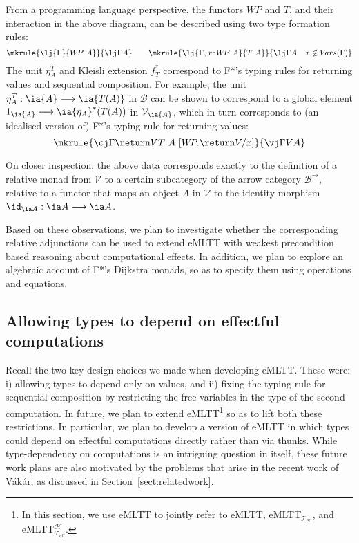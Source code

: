 From a programming language perspective, the functors $W\!P$ and $T$, and their interaction in the  above diagram, can be described using two type formation rules:
\vspace{0.15cm}
\[
\mkrule
{\lj {\Gamma} {W\!P~A}}
{\lj \Gamma A}
\qquad
\mkrule
{\lj {\Gamma, x \!:\! W\!P~A} {T~A}}
{\lj \Gamma A \quad x \not\in V\!ars(\Gamma)}
\]
The unit $\eta^T_A$ and Kleisli extension $f_T^\dagger$ correspond to F*'s typing rules for returning values and sequential composition. For example, the unit $\eta^T_A : \ia {A} \longrightarrow \ia {T(A)}$ in $\mathcal{B}$ can be shown to correspond to a global element $1_{\ia {A}} \longrightarrow \ia {\eta_A}^*(T(A))$ in $\mathcal{V}_{\ia {A}}$, which in turn corresponds to (an idealised version of) F*'s typing rule for returning values:
\vspace{0.15cm}
\[
\mkrule
{\cj \Gamma {\return V} {T~A~[W\!P.\return V/x]}}
{\vj \Gamma V A}
\]

On closer inspection, the above data corresponds exactly to the definition of a relative monad from $\mathcal{V}$ to a certain subcategory of the arrow category $\mathcal{B}^\to$, relative to a functor that maps an object $A$ in $\mathcal{V}$ to the identity morphism $\id_{\ia A} : \ia A \longrightarrow \ia A$.

Based on these observations, we plan to investigate whether the corresponding relative adjunctions can be used to extend eMLTT with weakest precondition based reasoning about computational effects. In addition, we plan to explore an algebraic account of F*'s Dijkstra monads, so as to specify them using operations and equations.




\subsection{Allowing types to depend on effectful computations}
\label{sect:typedependencyonfeffects}

Recall the two key design choices we made when developing eMLTT. These were: \linebreak i) allowing types to depend only on values, and ii) fixing the typing rule for sequential composition by restricting the free variables in the type of the second computation. In future, we plan to extend eMLTT\footnote{In this section, we use eMLTT to jointly refer to eMLTT, eMLTT$_{\mathcal{T}_{\text{eff}}}$, and eMLTT$_{\mathcal{T}_{\text{eff}}}^{\mathcal{H}}$.} so as to lift both these restrictions. In particular, we plan to develop a version of eMLTT in which types could depend on effectful computations directly rather than via thunks. While type-dependency on computations is an intriguing question in itself, these future work plans are also motivated by the problems that arise in the recent work of V{\'{a}}k{\'{a}}r, as discussed in Section~\ref{sect:relatedwork}.

